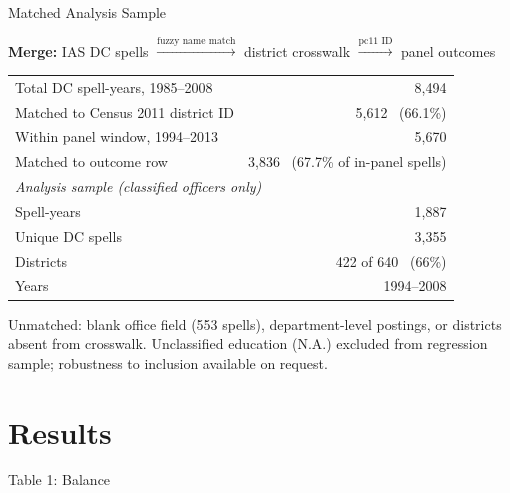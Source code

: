 \documentclass[aspectratio=169]{beamer}
\begin{document}

\begin{frame}{Matched Analysis Sample}

\textbf{Merge:} IAS DC spells $\xrightarrow{\text{fuzzy name match}}$ district crosswalk $\xrightarrow{\text{pc11 ID}}$ panel outcomes

\bigskip

{\small
\begin{tabular}{lr}
\toprule
Total DC spell-years, 1985--2008 & 8,494 \\
Matched to Census 2011 district ID & 5,612 \ (66.1\%) \\
Within panel window, 1994--2013 & 5,670 \\
Matched to outcome row & 3,836 \ (67.7\% of in-panel spells) \\
\midrule
\multicolumn{2}{l}{\textit{Analysis sample (classified officers only)}} \\
Spell-years & 1,887 \\
Unique DC spells & 3,355 \\
Districts & 422 of 640 \ (66\%) \\
Years & 1994--2008 \\
\bottomrule
\end{tabular}
}

\bigskip

{\small Unmatched: blank office field (553 spells), department-level postings, or districts absent from crosswalk. Unclassified education (N.A.) excluded from regression sample; robustness to inclusion available on request.}

\end{frame}

\section{Results}

\begin{frame}{Table 1: Balance}
\begin{center}
\end{center}
\end{frame}
\end{document}
